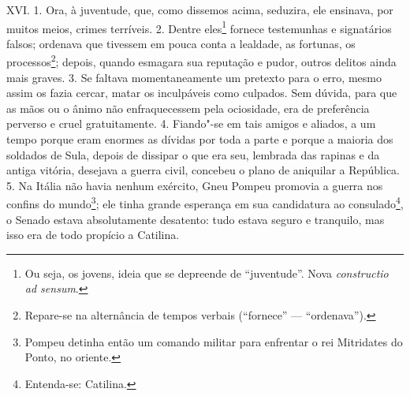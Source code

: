 XVI. 1. Ora, à juventude, que, como dissemos acima, seduzira, ele ensinava, por
muitos meios, crimes terríveis. 2. Dentre eles\footnote{Ou seja, os jovens, ideia que se depreende de ``juventude''. Nova \emph{constructio ad sensum}.} fornece testemunhas e
signatários falsos; ordenava que tivessem em pouca conta a lealdade, as
fortunas, os processos\footnote{Repare-se na alternância de tempos verbais
(``fornece'' --- ``ordenava'').}; depois, quando esmagara sua reputação e
pudor, outros delitos ainda mais graves. 3. Se faltava momentaneamente um
pretexto para o erro, mesmo assim os fazia cercar, matar os inculpáveis como
culpados.  Sem dúvida, para que as mãos ou o ânimo não enfraquecessem pela ociosidade,
era de preferência perverso e cruel gratuitamente. 4. Fiando"-se em tais amigos
e aliados, a um tempo porque eram enormes as dívidas por toda a parte e porque
a maioria dos soldados de Sula, depois de dissipar o que era seu, lembrada das
rapinas e da antiga vitória, desejava a guerra civil, concebeu o plano de
aniquilar a República. 5. Na Itália não havia nenhum exército, Gneu Pompeu
promovia a guerra nos confins do mundo\footnote{Pompeu detinha então um comando
militar para enfrentar o rei Mitridates do Ponto, no oriente.};  ele tinha
grande esperança em sua candidatura ao consulado\footnote{Entenda-se:
Catilina.}, o Senado estava absolutamente desatento: tudo estava seguro e
tranquilo, mas isso era de todo propício a Catilina.

